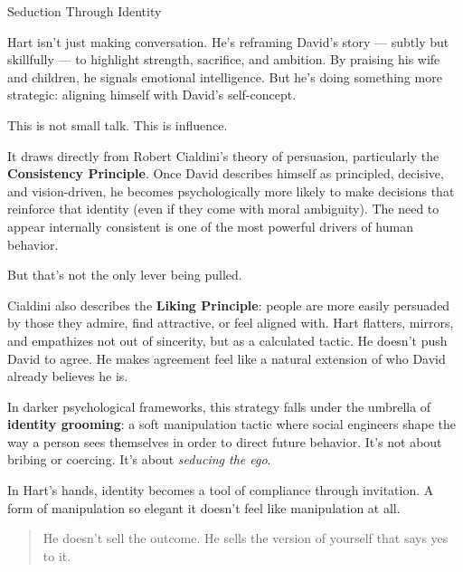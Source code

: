 \begin{PsychologicalSidebar}{Seduction Through Identity}

    Hart isn’t just making conversation. He’s reframing David’s story — subtly but skillfully — to highlight 
    strength, sacrifice, and ambition. By praising his wife and children, he signals emotional intelligence. But 
    he’s doing something more strategic: aligning himself with David’s self-concept.

    \medskip
    
    This is not small talk. This is influence.
    
    \medskip
    
    It draws directly from Robert Cialdini’s theory of persuasion, particularly the \textbf{Consistency Principle}.  
    Once David describes himself as principled, decisive, and vision-driven, he becomes psychologically more likely 
    to make decisions that reinforce that identity (even if they come with moral ambiguity). The need to appear 
    internally consistent is one of the most powerful drivers of human behavior.
    
    \medskip
    
    But that’s not the only lever being pulled.

    \medskip
    
    Cialdini also describes the \textbf{Liking Principle}: people are more easily persuaded by those they 
    admire, find attractive, or feel aligned with. Hart flatters, mirrors, and empathizes not out of sincerity, 
    but as a calculated tactic. He doesn't push David to agree. He makes agreement feel like a natural extension 
    of who David already believes he is.
    
    \medskip
    
    In darker psychological frameworks, this strategy falls under the umbrella of \textbf{identity grooming}:  
    a soft manipulation tactic where social engineers shape the way a person sees themselves in order to direct 
    future behavior. It’s not about bribing or coercing. It’s about \textit{seducing the ego}.
    
    \medskip
    
    In Hart’s hands, identity becomes a tool of compliance through invitation.  
    A form of manipulation so elegant it doesn’t feel like manipulation at all.
    
    \begin{quote}
    He doesn’t sell the outcome.  
    He sells the version of yourself that says yes to it.
    \end{quote}
    
\end{PsychologicalSidebar}
    

